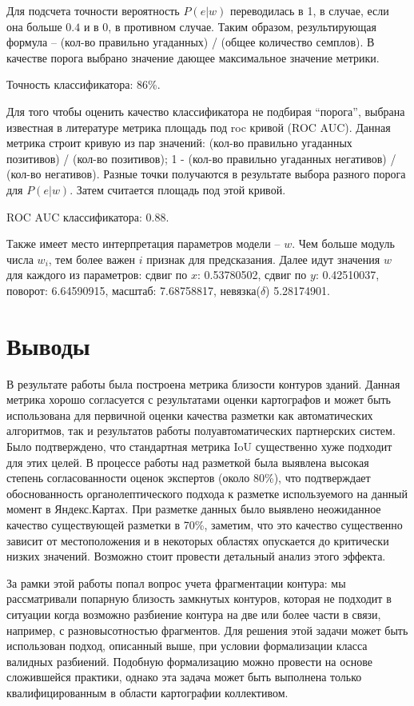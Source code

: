 \documentclass[12pt]{article}
\begin{document}
Для подсчета точности вероятность $P(e | w)$ переводилась в 1, в случае, если она больше $0.4$ и в 0, в противном случае. Таким образом, результирующая формула -- (кол-во правильно угаданных) / (общее количество семплов). В качестве порога выбрано значение дающее максимальное значение метрики.

Точность классификатора: 86\%.

Для того чтобы оценить качество классификатора не подбирая ``порога'', выбрана известная в литературе метрика площадь под roc кривой (ROC AUC). Данная метрика строит кривую из пар значений: (кол-во правильно угаданных позитивов)  / (кол-во позитивов); 1 - (кол-во правильно угаданных негативов) / (кол-во негативов). Разные точки получаются в результате выбора разного порога для $P(e | w)$. Затем считается площадь под этой кривой.

ROC AUC классификатора: 0.88.

Также имеет место интерпретация параметров модели -- $w$. Чем больше модуль числа $w_i$, тем более важен $i$ признак для предсказания. Далее идут значения $w$ для каждого из параметров:
сдвиг по $x$: 0.53780502, сдвиг по $y$: 0.42510037, поворот: 6.64590915, масштаб: 7.68758817, невязка($\delta$) 5.28174901.

\section{Выводы}
\label{conclusions}
В результате работы была построена метрика близости контуров зданий. Данная метрика хорошо согласуется с результатами оценки картографов и может быть использована для первичной оценки качества разметки как автоматических алгоритмов, так и результатов работы полуавтоматических партнерских систем. Было подтверждено, что стандартная метрика IoU существенно хуже подходит для этих целей. В процессе работы над разметкой была выявлена высокая степень согласованности оценок экспертов (около 80\%), что подтверждает обоснованность органолептического подхода к разметке используемого на данный момент в Яндекс.Картах. При разметке данных было выявлено неожиданное качество существующей разметки в 70\%, заметим, что это качество существенно зависит от местоположения и в некоторых областях опускается до критически низких значений. Возможно стоит провести детальный анализ этого эффекта.

За рамки этой работы попал вопрос учета фрагментации контура: мы рассматривали попарную близость замкнутых контуров, которая не подходит в ситуации когда возможно разбиение контура на две или более части в связи, например, с разновысотностью фрагментов. Для решения этой задачи может быть использован подход, описанный выше, при условии формализации класса валидных разбиений. Подобную формализацию можно провести на основе сложившейся практики, однако эта задача может быть выполнена только квалифицированным в области картографии коллективом.
\end{document}
